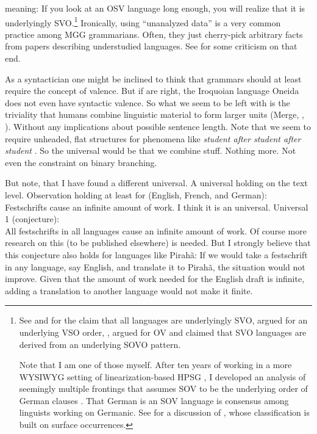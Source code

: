 \documentclass[output=paper,colorlinks,citecolor=brown]{langscibook}
\begin{document}
meaning: If you look at an OSV language long enough, you will realize that it is underlyingly SVO.\footnote{
See  and  for the claim that all languages are
underlyingly SVO,
\citet{McCawley70a-u} argued for an underlying VSO order, \citet[]{Bach71a-u}, \citet{Ross73a-u} argued for OV and
 claimed that SVO languages are derived from an
underlying SOVO pattern.

Note that I am one of those myself. After ten years of working in a more WYSIWYG setting of
linearization-based HPSG \citep{Mueller2004b}, I developed an analysis of seemingly multiple frontings that assumes SOV
to be the underlying order of German clauses \parencites{Mueller2005c,Mueller2005d,MuellerGS}. That
German is an SOV language is consensus among linguists working on Germanic. See
 for a discussion of , whose classification is built on
surface occurrences.
}
Ironically, using ``unanalyzed data'' is a very common practice among MGG
grammarians. Often, they just cherry-pick arbitrary facts from papers describing understudied
languages. See  for some criticism on that end.
 
As a syntactician one might be inclined to think that grammars should at least require the concept of valence. But
if \citet{KM2012a} are right, the Iroquoian language Oneida does not even have syntactic valence. So
what we seem to be left with is the triviality that humans combine linguistic material to form
larger units (Merge, \citealp{HCF2002a}, \citealp[]{MuellerCoreGram}). Without any implications about possible sentence length. Note that we seem to
require unheaded, flat structures for phenomena like \emph{student after student after student} \parencites{Matsuyama2004a}{Jackendoff2008a}{Bargmann2015a}[Section~4.1]{MuellerCxG}. So
the universal would be that we combine stuff. Nothing more. Not even the constraint on binary branching.

But note, that I have found a different universal. A universal holding on the text level. 
\ea
Observation holding at least for (English, French, and German):\\
Festschrifts cause an infinite amount of work.
\z
I think it is an universal.
\ea
Universal 1 (conjecture):\\
All festschrifts in all languages cause an infinite amount of work.
\z
Of course more research on this (to be published elsewhere) is needed. But I strongly believe that
this conjecture also holds for languages like Pirahã: If we would take a festschrift in
any language, say English, and translate it to Pirahã, the situation would not improve. Given that
the amount of work needed for the English draft is infinite, adding a translation to another
language would not make it finite. 
\end{document}
